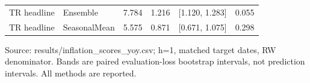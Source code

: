 \begin{table}[htbp]
\begin{tabularx}{\linewidth}{XlrrXr}
TR headline & Ensemble & 7.784 & 1.216 & [1.120, 1.283] & 0.055 \\
TR headline & SeasonalMean & 5.575 & 0.871 & [0.671, 1.075] & 0.298 \\
\bottomrule
\end{tabularx}
\par\vspace{3pt}\begin{minipage}{\linewidth}\footnotesize Source: results/inflation\_\allowbreak{}scores\_\allowbreak{}yoy.\allowbreak{}csv; h=1, matched target dates, RW denominator.\allowbreak{} Bands are paired evaluation-loss bootstrap intervals, not prediction intervals.\allowbreak{} All methods are reported.\allowbreak{}\end{minipage}
\end{table}

